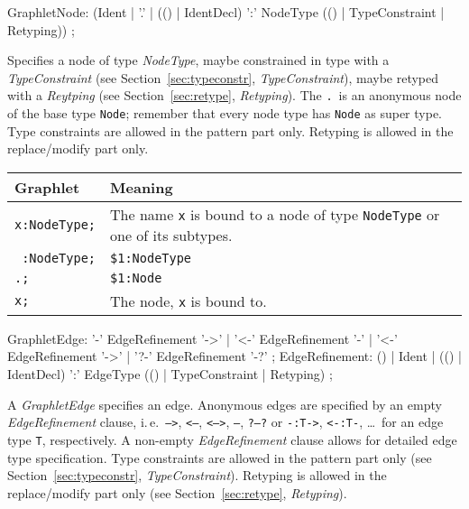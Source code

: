 \begin{rail}
GraphletNode: (Ident | 
    '.' |
    (() | IdentDecl) ':' NodeType (() | TypeConstraint | Retyping)) ;   
\end{rail}
Specifies a node of type \emph{NodeType},
maybe constrained in type with a \emph{TypeConstraint} (see Section~\ref{sec:typeconstr}, \emph{TypeConstraint}),
maybe retyped with a \emph{Reytping} (see Section~\ref{sec:retype}, \emph{Retyping}).
The \texttt{.}\ is an anonymous node of the base type \texttt{Node}; remember that every node type has \texttt{Node} as super type. 
Type constraints are allowed in the pattern part only. 
Retyping is allowed in the replace/modify part only.
\begin{center}
  \begin{tabularx}{\linewidth}{lX}
    \textbf{Graphlet} & \textbf{Meaning}\\ \hline
    \texttt{x:NodeType;} & The name \texttt{x} is bound to a node of type \texttt{NodeType} or one of its subtypes. \\
    \texttt{ :NodeType;} & \texttt{\$1:NodeType} \\
    \texttt{.;} & \texttt{\$1:Node} \\
    \texttt{x;} & The node, \texttt{x} is bound to.
  \end{tabularx}
\end{center} 

\begin{rail}
  GraphletEdge: '-' EdgeRefinement '->'  | '<-' EdgeRefinement '-'  | '<-' EdgeRefinement '->' | '?-' EdgeRefinement '-?' ;
  EdgeRefinement: () | Ident | (() | IdentDecl) ':' EdgeType (() | TypeConstraint | Retyping) ;
\end{rail}
A \emph{GraphletEdge} specifies an edge. 
Anonymous edges are specified by an empty \emph{EdgeRefinement} clause, i.\,e.\ \texttt{-->}, \texttt{<--}, \texttt{<-->}, \texttt{--}, \texttt{?--?} or \texttt{-:T->}, \texttt{<-:T-}, \dots\ for an edge type \texttt{T}, respectively. 
A non-empty \emph{EdgeRefinement} clause allows for detailed edge type specification. 
Type constraints are allowed in the pattern part only (see Section~\ref{sec:typeconstr}, \emph{TypeConstraint}).
Retyping is allowed in the replace/modify part only (see Section~\ref{sec:retype}, \emph{Retyping}).

